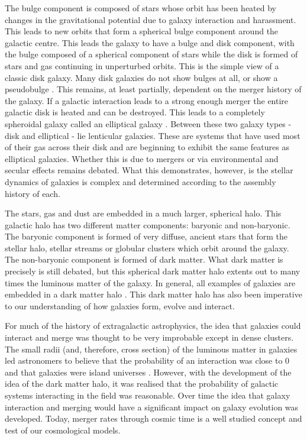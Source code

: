 The bulge component is composed of stars whose orbit has been heated by changes in the gravitational potential due to galaxy interaction and harassment. This leads to new orbits that form a spherical bulge component around the galactic centre. This leads the galaxy to have a bulge and disk component, with the bulge composed of a spherical component of stars while the disk is formed of stars and gas continuing in unperturbed orbits. This is the simple view of a classic disk galaxy. Many disk galaxies do not show bulges at all, or show a pseudobulge \citep{2009MNRAS.399..621G}. This remains, at least partially, dependent on the merger history of the galaxy. If a galactic interaction leads to a strong enough merger the entire galactic disk is heated and can be destroyed. This leads to a completely spheroidal galaxy called an elliptical galaxy \citep{1977egsp.conf..401T, 2006MNRAS.366..499D}. Between these two galaxy types - disk and elliptical - lie lenticular galaxies. These are systems that have used most of their gas across their disk and are beginning to exhibit the same features as elliptical galaxies. Whether this is due to mergers \citep{2004ApJ...616..192C, 2005ApJ...621..246B} or via environmental and secular effects \citep{2002MNRAS.330..251M, 2018MNRAS.476.2137R} remains debated. What this demonstrates, however, is the stellar dynamics of galaxies is complex and determined according to the assembly history of each.

The stars, gas and dust are embedded in a much larger, spherical halo. This galactic halo has two different matter components: baryonic and non-baryonic. The baryonic component is formed of very diffuse, ancient stars that form the stellar halo, stellar streams or globular clusters which orbit around the galaxy. The non-baryonic component is formed of dark matter. What dark matter is precisely is still debated, but this spherical dark matter halo extents out to many times the luminous matter of the galaxy. In general, all examples of galaxies are embedded in a dark matter halo \cite[although there are some debated exceptions as described in][]{2018Natur.555..629V}. This dark matter halo has also been imperative to our understanding of how galaxies form, evolve and interact.

For much of the history of extragalactic astrophysics, the idea that galaxies could interact and merge was thought to be very improbable except in dense clusters. The small radii (and, therefore, cross section) of the luminous matter in galaxies led astronomers to believe that the probability of an interaction was close to 0 and that galaxies were island universes \citep{1755anth.book.....K, 1917PASP...29..206C}. However, with the development of the idea of the dark matter halo, it was realised that the probability of galactic systems interacting in the field was reasonable. Over time the idea that galaxy interaction and merging would have a significant impact on galaxy evolution was developed. Today, merger rates through cosmic time is a well studied concept and test of our cosmological models.

